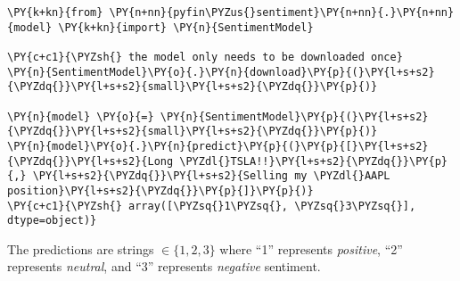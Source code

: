 \begin{Verbatim}[commandchars=\\\{\}]
\PY{k+kn}{from} \PY{n+nn}{pyfin\PYZus{}sentiment}\PY{n+nn}{.}\PY{n+nn}{model} \PY{k+kn}{import} \PY{n}{SentimentModel}

\PY{c+c1}{\PYZsh{} the model only needs to be downloaded once}
\PY{n}{SentimentModel}\PY{o}{.}\PY{n}{download}\PY{p}{(}\PY{l+s+s2}{\PYZdq{}}\PY{l+s+s2}{small}\PY{l+s+s2}{\PYZdq{}}\PY{p}{)}

\PY{n}{model} \PY{o}{=} \PY{n}{SentimentModel}\PY{p}{(}\PY{l+s+s2}{\PYZdq{}}\PY{l+s+s2}{small}\PY{l+s+s2}{\PYZdq{}}\PY{p}{)}
\PY{n}{model}\PY{o}{.}\PY{n}{predict}\PY{p}{(}\PY{p}{[}\PY{l+s+s2}{\PYZdq{}}\PY{l+s+s2}{Long \PYZdl{}TSLA!!}\PY{l+s+s2}{\PYZdq{}}\PY{p}{,} \PY{l+s+s2}{\PYZdq{}}\PY{l+s+s2}{Selling my \PYZdl{}AAPL position}\PY{l+s+s2}{\PYZdq{}}\PY{p}{]}\PY{p}{)}
\PY{c+c1}{\PYZsh{} array([\PYZsq{}1\PYZsq{}, \PYZsq{}3\PYZsq{}], dtype=object)}
\end{Verbatim}

The predictions are strings $\in \{1, 2, 3\}$ where ``1'' represents \emph{positive}, ``2'' represents \emph{neutral}, and ``3'' represents \emph{negative} sentiment.



